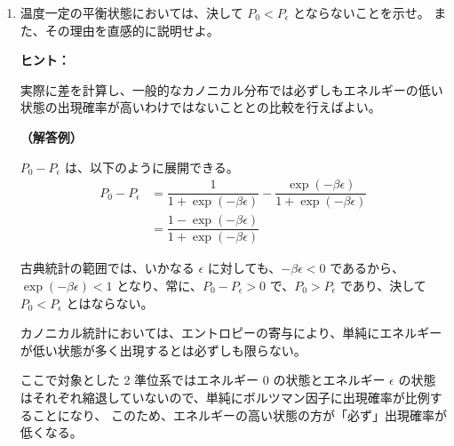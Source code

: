 \documentclass[uplatex,dvipdfmx,a4paper,11pt]{jsarticle}
\begin{document}
\begin{enumerate}
\begin{itembox}[l]{{\bf ヒント：}}

それぞれの状態のボルツマン因子を前問で求めた一粒子状態和で割れば、その状態を占める確率となることを用いればよい。

\end{itembox} 

{\bf （解答例）}

それぞれの状態のボルツマン因子を一粒子状態和で除して、求める確率は以下のように算出できる。
\begin{equation*}
\begin{cases}
P_0 = \dfrac{1}{z} \exp(-\beta \times 0) = \dfrac{1}{1 + \exp(-\beta \epsilon)} \\[10pt]
P_{\epsilon} = \dfrac{1}{z} \exp(-\beta \times \epsilon) = \dfrac{\exp(-\beta \epsilon)}{1 + \exp(-\beta \epsilon)}
\end{cases}
\end{equation*}

\newpage

\item
温度一定の平衡状態においては、決して $P_0 < P_{\epsilon}$ とならないことを示せ。
また、その理由を直感的に説明せよ。
\vspace{8pt}

\begin{itembox}[l]{{\bf ヒント：}}

実際に差を計算し、一般的なカノニカル分布では必ずしもエネルギーの低い状態の出現確率が高いわけではないこととの比較を行えばよい。

\end{itembox}

{\bf （解答例）}

$P_0 - P_{\epsilon} $ は、以下のように展開できる。
\begin{align*}
P_0 - P_{\epsilon} 
	&= \dfrac{1}{1 + \exp(-\beta \epsilon)} - \dfrac{\exp(-\beta \epsilon)}{1 + \exp(-\beta \epsilon)} \\[10pt]
	&= \dfrac{1 - \exp(-\beta \epsilon)}{1 + \exp(-\beta \epsilon)}
\end{align*}

古典統計の範囲では、いかなる $\epsilon$ に対しても、$-\beta \epsilon < 0$ であるから、 $\exp(-\beta \epsilon) < 1$ となり、常に、$P_0 - P_{\epsilon} >0$ で、$P_0 > P_{\epsilon}$ であり、決して $P_0 < P_{\epsilon}$ とはならない。 

カノニカル統計においては、エントロピーの寄与により、単純にエネルギーが低い状態が多く出現するとは必ずしも限らない。

ここで対象とした 2 準位系ではエネルギー 0 の状態とエネルギー $\epsilon$ の状態はそれぞれ縮退していないので、単純にボルツマン因子に出現確率が比例することになり、
このため、エネルギーの高い状態の方が「必ず」出現確率が低くなる。

\color{black}

\end{enumerate}
\end{document}
